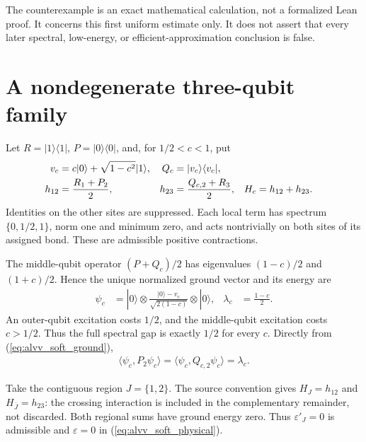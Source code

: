 \documentclass{article}
\begin{document}
The counterexample is an exact mathematical calculation, not a formalized
Lean proof. It concerns this first uniform estimate only. It does not assert
that every later spectral, low-energy, or efficient-approximation conclusion
is false.

\section{A nondegenerate three-qubit family}

Let $R=|1\rangle\langle1|$, $P=|0\rangle\langle0|$, and, for
$1/2<c<1$, put
\begin{align}
    v_c    & =c|0\rangle+\sqrt{1-c^2}|1\rangle, &
    Q_c    & =|v_c\rangle\langle v_c|,\notag                            \\
    h_{12} & =\frac{R_1+P_2}{2},                &
    h_{23} & =\frac{Q_{c,2}+R_3}{2},            & H_c & =h_{12}+h_{23}.
    \label{eq:alvv_soft_example}
\end{align}
Identities on the other sites are suppressed. Each local term has spectrum
$\{0,1/2,1\}$, norm one and minimum zero, and acts nontrivially on both
sites of its assigned bond. These are admissible positive contractions.

The middle-qubit operator $(P+Q_c)/2$ has eigenvalues $(1-c)/2$ and
$(1+c)/2$. Hence the unique normalized ground vector and its energy are
\begin{align}
    \psi_c                                               & =|0\rangle\otimes
    \frac{|0\rangle-v_c}{\sqrt{2(1-c)}}\otimes|0\rangle, &
    \lambda_c                                            & =\frac{1-c}{2}.
    \label{eq:alvv_soft_ground}
\end{align}
An outer-qubit excitation costs $1/2$, and the middle-qubit excitation costs
$c>1/2$. Thus the full spectral gap is exactly $1/2$ for every $c$.
Directly from (\ref{eq:alvv_soft_ground}),
\begin{align}
    \langle\psi_c,P_2\psi_c\rangle
    =\langle\psi_c,Q_{c,2}\psi_c\rangle=\lambda_c.
    \label{eq:alvv_soft_expectations}
\end{align}

Take the contiguous region $J=\{1,2\}$. The source convention gives
$H_J=h_{12}$ and $H_{\overline J}=h_{23}$: the crossing interaction is
included in the complementary remainder, not discarded. Both regional sums
have ground energy zero. Thus $\varepsilon'_J=0$ is admissible and
$\varepsilon=0$ in (\ref{eq:alvv_soft_physical}).
\end{document}
